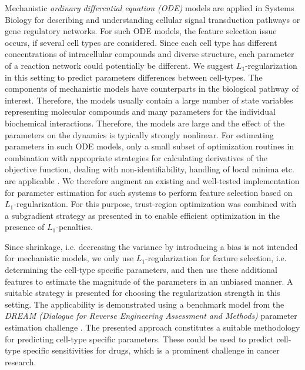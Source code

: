 \documentclass{bioinfo}
\begin{document}
Mechanistic  \emph{ordinary differential equation (ODE)} models are applied in Systems Biology for describing and understanding cellular signal transduction pathways or gene regulatory networks. 
For such ODE models, the feature selection issue occurs, if several cell types are considered. 
Since each cell type has different concentrations of intracellular compounds and diverse structure, each parameter of a reaction network could potentially be different. 
We suggest $L_1$-regularization in this setting to predict parameters differences between cell-types.
The components of mechanistic models have counterparts in the biological pathway of interest. 
Therefore, the models usually contain a large number of state variables representing molecular compounds and many parameters for the individual biochemical interactions. 
Therefore, the models are large and the effect of the parameters on the dynamics is typically strongly nonlinear. 
For estimating parameters in such ODE models, only a small subset of optimization routines in combination with appropriate strategies for calculating derivatives of the objective function, dealing with non-identifiability, handling of local minima etc. are applicable \citep{Raue2013}. 
We therefore augment an existing and well-tested implementation for parameter estimation for such systems \citep{Raue2015} to perform feature selection based on $L_1$-regularization. 
For this purpose, trust-region optimization \citep{Coleman96} was combined with a subgradient strategy as presented in \citep{Schmidt09} to enable efficient optimization in the presence of $L_1$-penalties. %

Since shrinkage, i.e. decreasing the variance by introducing a bias is not intended for mechanistic models, we only use $L_1$-regularization for feature selection, i.e. determining the cell-type specific parameters, and then use these additional features to estimate the magnitude of the parameters in an unbiased manner. 
A suitable strategy is presented for choosing the regularization strength in this setting. 
The applicability is demonstrated using a benchmark model from the \emph{DREAM (Dialogue for Reverse Engineering Assessment and Methods)} parameter estimation challenge \citep{Steiert12}. 
The presented approach constitutes a suitable methodology for predicting cell-type specific parameters.
These could be used to predict cell-type specific sensitivities for drugs, which is a prominent challenge in cancer research.
\end{document}
